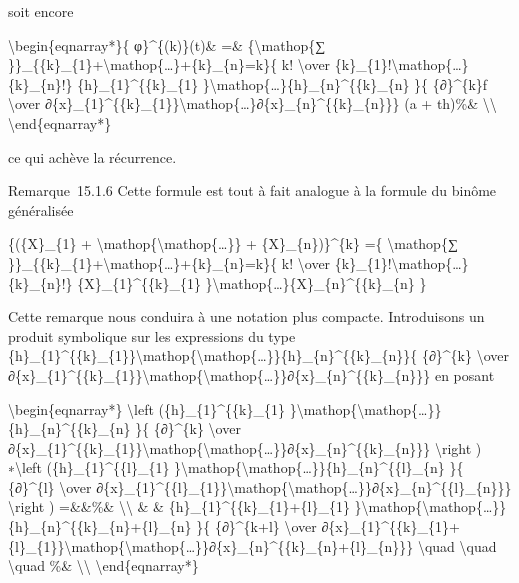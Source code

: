 \documentclass[]{article}
\begin{document}
soit encore

\textbackslash{}begin\{eqnarray*\}\{ φ\}\^{}\{(k)\}(t)\& =\&
\{\textbackslash{}mathop\{∑
\}\}\_\{\{k\}\_\{1\}+\textbackslash{}mathop\{\ldots{}\}+\{k\}\_\{n\}=k\}\{
k! \textbackslash{}over
\{k\}\_\{1\}!\textbackslash{}mathop\{\ldots{}\}\{k\}\_\{n\}!\}
\{h\}\_\{1\}\^{}\{\{k\}\_\{1\}
\}\textbackslash{}mathop\{\ldots{}\}\{h\}\_\{n\}\^{}\{\{k\}\_\{n\} \}\{
\{∂\}\^{}\{k\}f \textbackslash{}over
∂\{x\}\_\{1\}\^{}\{\{k\}\_\{1\}\}\textbackslash{}mathop\{\ldots{}\}∂\{x\}\_\{n\}\^{}\{\{k\}\_\{n\}\}\}
(a + th)\%\& \textbackslash{}\textbackslash{}
\textbackslash{}end\{eqnarray*\}

ce qui achève la récurrence.

Remarque~15.1.6 Cette formule est tout à fait analogue à la formule du
binôme généralisée

\{(\{X\}\_\{1\} +
\textbackslash{}mathop\{\textbackslash{}mathop\{\ldots{}\}\} +
\{X\}\_\{n\})\}\^{}\{k\} =\{ \textbackslash{}mathop\{∑
\}\}\_\{\{k\}\_\{1\}+\textbackslash{}mathop\{\ldots{}\}+\{k\}\_\{n\}=k\}\{
k! \textbackslash{}over
\{k\}\_\{1\}!\textbackslash{}mathop\{\ldots{}\}\{k\}\_\{n\}!\}
\{X\}\_\{1\}\^{}\{\{k\}\_\{1\}
\}\textbackslash{}mathop\{\ldots{}\}\{X\}\_\{n\}\^{}\{\{k\}\_\{n\} \}

Cette remarque nous conduira à une notation plus compacte. Introduisons
un produit symbolique sur les expressions du type
\{h\}\_\{1\}\^{}\{\{k\}\_\{1\}\}\textbackslash{}mathop\{\textbackslash{}mathop\{\ldots{}\}\}\{h\}\_\{n\}\^{}\{\{k\}\_\{n\}\}\{
\{∂\}\^{}\{k\} \textbackslash{}over
∂\{x\}\_\{1\}\^{}\{\{k\}\_\{1\}\}\textbackslash{}mathop\{\textbackslash{}mathop\{\ldots{}\}\}∂\{x\}\_\{n\}\^{}\{\{k\}\_\{n\}\}\}
en posant

\textbackslash{}begin\{eqnarray*\} \textbackslash{}left
(\{h\}\_\{1\}\^{}\{\{k\}\_\{1\}
\}\textbackslash{}mathop\{\textbackslash{}mathop\{\ldots{}\}\}\{h\}\_\{n\}\^{}\{\{k\}\_\{n\}
\}\{ \{∂\}\^{}\{k\} \textbackslash{}over
∂\{x\}\_\{1\}\^{}\{\{k\}\_\{1\}\}\textbackslash{}mathop\{\textbackslash{}mathop\{\ldots{}\}\}∂\{x\}\_\{n\}\^{}\{\{k\}\_\{n\}\}\}
\textbackslash{}right ) ∗\textbackslash{}left
(\{h\}\_\{1\}\^{}\{\{l\}\_\{1\}
\}\textbackslash{}mathop\{\textbackslash{}mathop\{\ldots{}\}\}\{h\}\_\{n\}\^{}\{\{l\}\_\{n\}
\}\{ \{∂\}\^{}\{l\} \textbackslash{}over
∂\{x\}\_\{1\}\^{}\{\{l\}\_\{1\}\}\textbackslash{}mathop\{\textbackslash{}mathop\{\ldots{}\}\}∂\{x\}\_\{n\}\^{}\{\{l\}\_\{n\}\}\}
\textbackslash{}right ) =\&\&\%\& \textbackslash{}\textbackslash{} \& \&
\{h\}\_\{1\}\^{}\{\{k\}\_\{1\}+\{l\}\_\{1\}
\}\textbackslash{}mathop\{\textbackslash{}mathop\{\ldots{}\}\}\{h\}\_\{n\}\^{}\{\{k\}\_\{n\}+\{l\}\_\{n\}
\}\{ \{∂\}\^{}\{k+l\} \textbackslash{}over
∂\{x\}\_\{1\}\^{}\{\{k\}\_\{1\}+\{l\}\_\{1\}\}\textbackslash{}mathop\{\textbackslash{}mathop\{\ldots{}\}\}∂\{x\}\_\{n\}\^{}\{\{k\}\_\{n\}+\{l\}\_\{n\}\}\}
\textbackslash{}quad \textbackslash{}quad \textbackslash{}quad \%\&
\textbackslash{}\textbackslash{} \textbackslash{}end\{eqnarray*\}
\end{document}
